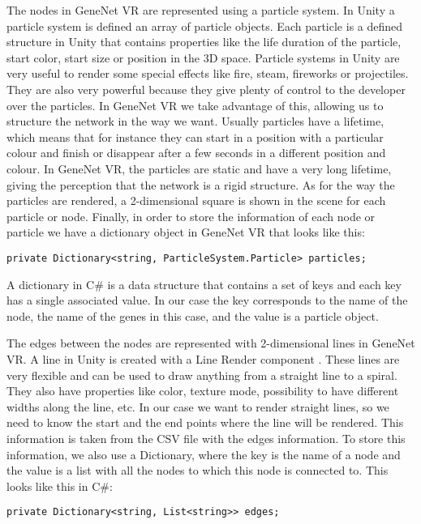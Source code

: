 The nodes in GeneNet VR are represented using a particle system. In Unity a particle system \cite{particle_system} is defined an array of particle objects. Each particle is a defined structure in Unity that contains properties like the life duration of the particle, start color, start size or position in the 3D space. Particle systems in Unity are very useful to render some special effects like fire, steam, fireworks or projectiles. They are also very powerful because they give plenty of control to the developer over the particles. In GeneNet VR we take advantage of this, allowing us to structure the network in the way we want. Usually particles have a lifetime, which means that for instance they can start in a position with a particular colour and finish or disappear after a few seconds in a different position and colour. In GeneNet VR, the particles are static and have a very long lifetime, giving the perception that the network is a rigid structure. As for the way the particles are rendered, a 2-dimensional square is shown in the scene for each particle or node. Finally, in order to store the information of each node or particle we have a dictionary object in GeneNet VR that looks like this:

\begin{verbatim}
private Dictionary<string, ParticleSystem.Particle> particles;
\end{verbatim}

A dictionary in C\# is a data structure that contains a set of keys and each key has a single associated value. In our case the key corresponds to the name of the node, the name of the genes in this case, and the value is a particle object.

The edges between the nodes are represented with 2-dimensional lines in GeneNet VR. A line in Unity is created with a Line Render component \cite{line_render}. These lines are very flexible and can be used to draw anything from a straight line to a spiral. They also have properties like color, texture mode, possibility to have different widths along the line, etc. In our case we want to render straight lines, so we need to know the start and the end points where the line will be rendered. This information is taken from the CSV file with the edges information. To store this information, we also use a Dictionary, where the key is the name of a node and the value is a list with all the nodes to which this node is connected to. This looks like this in C\#:

\begin{verbatim}
private Dictionary<string, List<string>> edges;
\end{verbatim}

